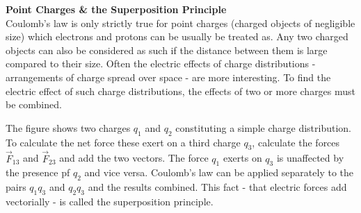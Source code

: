 \documentclass[a4paper]{article}
\let\bf\textbf
\begin{document}
\bf{Point Charges \& the Superposition Principle}
\vspace{1mm}\\
Coulomb's law is only strictly true for point charges (charged objects of negligible size) which electrons and protons can be usually be treated as. Any two charged objects can also be considered as such if the distance between them is large compared to their size. Often the electric effects of charge distributions - arrangements of charge spread over space - are more interesting. To find the electric effect of such charge distributions, the effects of two or more charges must be combined.
\begin{center}
\end{center}
The figure shows two charges $q_1$ and $q_2$ constituting a simple charge distribution. To calculate the net force these exert on a third charge $q_3$, calculate the forces $\vec{F}_{13}$ and $\vec{F}_{23}$ and add the two vectors. The force $q_1$ exerts on $q_3$ is unaffected by the presence pf $q_2$ and vice versa. Coulomb's law can be applied separately to the pairs $q_1q_3$ and $q_2q_3$ and the results combined. This fact - that electric forces add vectorially - is called the superposition principle.
\end{document}
